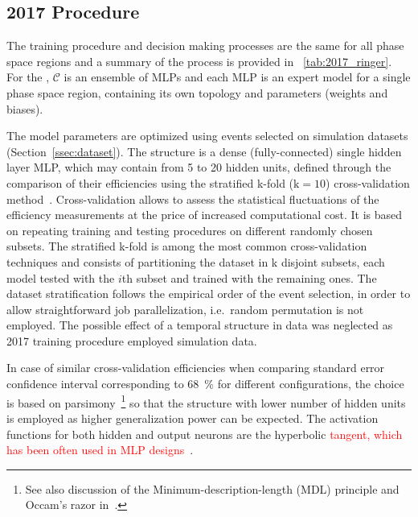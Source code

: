 \subsection{2017 Procedure}\label{ssec:2017}

The training procedure and decision making processes are the same for all phase
space regions and a summary of the process is provided in
\tablename~\ref{tab:2017_ringer}. For the \rnn{}, $\mathcal{C}$ is an ensemble of
MLPs and each MLP is an expert model for a single phase space
region, containing its own topology and parameters (weights and biases).

The model parameters are optimized using events selected on simulation datasets
(Section~\ref{ssec:dataset}). The structure is a dense (fully-connected) single
hidden layer MLP, which may contain from 5 to 20 hidden units, defined through
the comparison of their efficiencies using the stratified k-fold ($\text{k}=10$)
cross-validation method~\cite{haykin_2008}. Cross-validation allows to assess the statistical fluctuations of the efficiency measurements 
at the price of increased computational cost. It is
based on repeating training and testing procedures on different
randomly chosen subsets. The stratified k-fold is
among the most common cross-validation techniques and consists of partitioning
the dataset in k disjoint subsets, each model tested with the $i$th subset and
trained with the remaining ones. The dataset stratification follows the
empirical order of the event selection, in order to allow straightforward job
parallelization, i.e.\ random permutation is not employed. The possible effect
of a temporal structure in data was neglected as 2017 training procedure
employed simulation data.

In case of similar cross-validation efficiencies when comparing standard
error confidence interval corresponding to \SI{68}{\%} for different
configurations, the choice is based on
parsimony~\cite{medeiros2001statistical}\footnote{See also discussion of the
  Minimum-description-length (MDL) principle and Occam's razor
in~\cite{haykin_2008}.} so that the structure with lower number of hidden units
is employed as higher generalization power can be expected. The activation
functions for both hidden and output neurons are the hyperbolic \textcolor{red}{tangent, which has been often used in MLP designs~\cite{haykin_2008}}.






